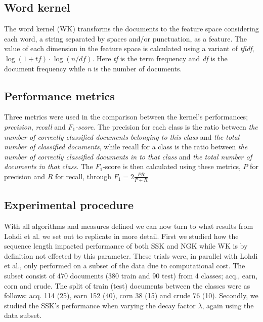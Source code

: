 
\subsection{Word kernel}
The word kernel (WK) transforms the documents to the feature space considering each word, a string separated by spaces and/or punctuation, as a feature. The value of each dimension in the feature space is calculated using a variant of \textit{tfidf}, $ \log(1+tf) \cdot \log(n/df) $. Here \textit{tf} is the term frequency and \textit{df} is the document frequency while \textit{n} is the number of documents. 


\subsection{Performance metrics}
Three metrics were used in the comparison between the kernel's performances; \textit{precision}, \textit{recall} and \textit{$ F_1 $-score}. The precision for each class is the ratio between \textit{the number of correctly classified documents belonging to this class} and \textit{the total number of classified documents}, while recall for a class is the ratio between \textit{the number of correctly classified documents in to that class} and \textit{the total number of documents in that class}. The $ F_1 $-score is then calculated using these metrics, $ P $ for precision and $ R $ for recall, through $F_1 = 2\frac{PR}{P+R}$


\subsection{Experimental procedure}
With all algorithms and measures defined we can now turn to what results from Lohdi et al. we set out to replicate in more detail. First we studied how the sequence length impacted performance of both SSK and NGK while WK is by definition not effected by this parameter. These trials were, in parallel with Lohdi et al., only performed on a subset of the data due to computational cost. The subset consist of 470 documents (380 train and 90 test) from  4 classes; acq., earn, corn and crude. The split of train (test) documents between the classes were as follows: acq. 114 (25), earn 152 (40), corn 38 (15) and crude 76 (10). Secondly, we studied the SSK's performance when varying the decay factor $ \lambda $, again using the data subset. %


